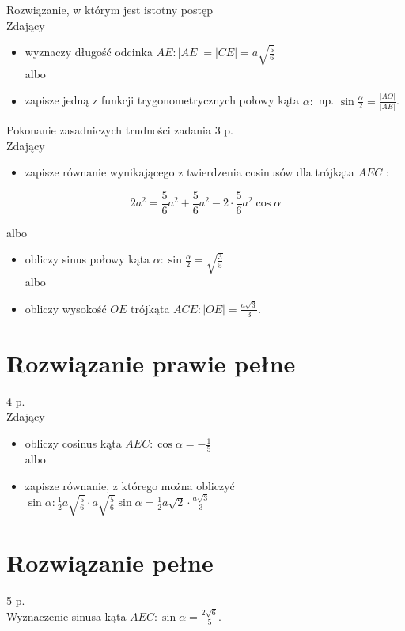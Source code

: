\documentclass[10pt]{article}
\begin{document}
Rozwiązanie, w którym jest istotny postęp\\
Zdający

\begin{itemize}
  \item wyznaczy długość odcinka $A E:|A E|=|C E|=a \sqrt{\frac{5}{6}}$\\
albo
  \item zapisze jedną z funkcji trygonometrycznych połowy kąta $\alpha:$ np. $\sin \frac{\alpha}{2}=\frac{|A O|}{|A E|}$.
\end{itemize}

Pokonanie zasadniczych trudności zadania 3 p.\\
Zdający

\begin{itemize}
  \item zapisze równanie wynikającego z twierdzenia cosinusów dla trójkąta $A E C$ :
\end{itemize}

$$
2 a^{2}=\frac{5}{6} a^{2}+\frac{5}{6} a^{2}-2 \cdot \frac{5}{6} a^{2} \cos \alpha
$$

albo

\begin{itemize}
  \item obliczy sinus połowy kąta $\alpha: \sin \frac{\alpha}{2}=\sqrt{\frac{3}{5}}$\\
albo
  \item obliczy wysokość $O E$ trójkąta $A C E:|O E|=\frac{a \sqrt{3}}{3}$.
\end{itemize}

\section*{Rozwiązanie prawie pełne}
4 p.\\
Zdający

\begin{itemize}
  \item obliczy cosinus kąta $A E C: \cos \alpha=-\frac{1}{5}$\\
albo
  \item zapisze równanie, z którego można obliczyć $\sin \alpha: \frac{1}{2} a \sqrt{\frac{5}{6}} \cdot a \sqrt{\frac{5}{6}} \sin \alpha=\frac{1}{2} a \sqrt{2} \cdot \frac{a \sqrt{3}}{3}$
\end{itemize}

\section*{Rozwiązanie pełne}
5 p.\\
Wyznaczenie sinusa kąta $A E C: \sin \alpha=\frac{2 \sqrt{6}}{5}$.
\end{document}
